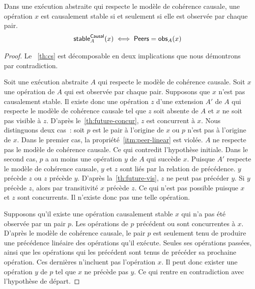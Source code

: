 \begin{theorem}\label{th:cs}
Dans une exécution abstraite qui respecte le modèle de cohérence causale, une opération $x$ est causalement stable si et seulement si elle est observée par chaque pair.
\begin{equation*}
    \operatorname{\mathsf{stable}}_A^{\operatorname{\mathsf{Causal}}}(x) \iff \operatorname{\mathsf{Peers}} = \operatorname{\mathsf{obs}}_A(x)
\end{equation*}
\end{theorem}

\begin{proof}
Le ~\autoref{th:cs} est décomposable en deux implications que nous démontrons par contradiction.

Soit une exécution abstraite $A$ qui respecte le modèle de cohérence causale.
Soit $x$ une opération de $A$ qui est observée par chaque pair.
Supposons que $x$ n'est pas causalement stable.
Il existe donc une opération $z$ d'une extension $A'$ de $A$ qui respecte le modèle de cohérence causale tel que $z$ soit absente de $A$ et $x$ ne soit pas visible à $z$.
D'après le~\autoref{th:future-concur}, $z$ est concurrent à $x$.
Nous distinguons deux cas~: soit $p$ est le pair à l'origine de $x$ ou $p$ n'est pas à l'origine de $x$.
Dans le premier cas, la propriété~\ref{itm:peer-linear} est violée.
$A$ ne respecte pas le modèle de cohérence causale.
Ce qui contredit l'hypothèse initiale.
Dans le second cas, $p$ a au moins une opération $y$ de $A$ qui succède $x$.
Puisque $A'$ respecte le modèle de cohérence causale, $y$ et $z$ sont liés par la relation de précédence.
$y$ précède $z$ ou $z$ précède $y$.
D'après la~\autoref{th:future-vis}, $z$ ne peut pas précéder $y$.
Si $y$ précède $z$, alors par transitivité $x$ précède $z$.
Ce qui n'est pas possible puisque $x$ et $z$ sont concurrents.
Il n'existe donc pas une telle opération.

Supposons qu'il existe une opération causalement stable $x$ qui n'a pas été observée par un pair $p$.
Les opérations de $p$ précédent ou sont concurrentes à $x$.
D'après le modèle de cohérence causale, le pair $p$ est seulement tenu de produire une précédence linéaire des opérations qu'il exécute.
Seules ses opérations passées, ainsi que les opérations qui les précédent sont tenus de précéder sa prochaine opération.
Ces dernières n'incluent pas l'opération $x$.
Il peut donc exister une opération $y$ de $p$ tel que $x$ ne précède pas $y$.
Ce qui rentre en contradiction avec l'hypothèse de départ.
\end{proof}


